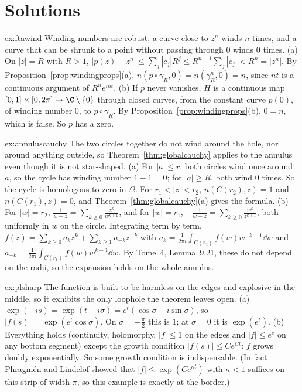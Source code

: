 \section{Solutions}

\begin{solution}{ex:ftawind}
\idea Winding numbers are robust: a curve close to $z^n$ winds $n$ times, and a curve that can be shrunk to a point without passing through $0$ winds $0$ times.
\writeup (a) On $|z|=R$ with $R>1$, $|p(z)-z^n|\le\sum_j|c_j|R^j\le R^{n-1}\sum_j|c_j|<R^n=|z^n|$. By Proposition~\ref{prop:windingprops}(a), $n(p\circ\gamma_R,0)=n(\gamma_R^n,0)=n$, since $nt$ is a
continuous argument of $R^ne^{int}$. (b) If $p$ never vanishes, $H$ is a continuous map $[0,1]\times[0,2\pi]\to\C\setminus\{0\}$ through closed curves, from the constant curve $p(0)$, of winding number $0$, to
$p\circ\gamma_R$. By Proposition~\ref{prop:windingprops}(b), $0=n$, which is false. So $p$ has a zero.
\end{solution}

\begin{solution}{ex:annuluscauchy}
\idea The two circles together do not wind around the hole, nor around anything outside, so Theorem~\ref{thm:globalcauchy} applies to the annulus even though it is not star-shaped.
\writeup (a) For $|a|\le r$, both circles wind once around $a$, so the cycle has winding number $1-1=0$; for $|a|\ge R$, both wind $0$ times. So the cycle is homologous to zero in $\Omega$. For
$r_1<|z|<r_2$, $n(C(r_2),z)=1$ and $n(C(r_1),z)=0$, and Theorem~\ref{thm:globalcauchy}(a) gives the formula. (b) For $|w|=r_2$, $\frac1{w-z}=\sum_{k\ge0}\frac{z^k}{w^{k+1}}$, and for $|w|=r_1$,
$-\frac1{w-z}=\sum_{k\ge0}\frac{w^k}{z^{k+1}}$, both uniformly in $w$ on the circle. Integrating term by term, $f(z)=\sum_{k\ge0}a_kz^k+\sum_{k\ge1}a_{-k}z^{-k}$ with $a_k=\frac1{2\pi i}\int_{C(r_2)}f(w)w^{-k-1}\dd w$ and
$a_{-k}=\frac1{2\pi i}\int_{C(r_1)}f(w)w^{k-1}\dd w$. By Tome~4, Lemma~9.21, these do not depend on the radii, so the expansion holds on the whole annulus.
\end{solution}

\begin{solution}{ex:plsharp}
\idea The function is built to be harmless on the edges and explosive in the middle, so it exhibits the only loophole the theorem leaves open.
\writeup (a) $\exp(-is)=\exp(t-i\sigma)=e^t(\cos\sigma-i\sin\sigma)$, so $|f(s)|=\exp(e^t\cos\sigma)$. On $\sigma=\pm\frac\pi2$ this is $1$; at $\sigma=0$ it is $\exp(e^t)$. (b) Everything holds (continuity, holomorphy,
$|f|\le1$ on the edges and $|f|\le e^e$ on any bottom segment) except the growth condition $|f(s)|\le Ce^{Ct}$: $f$ grows doubly exponentially. So some growth condition is indispensable. (In fact
Phragm\'en and Lindel\"of showed that $|f|\le\exp(Ce^{\kappa t})$ with $\kappa<1$ suffices on this strip of width $\pi$, so this example is exactly at the border.)
\end{solution}

